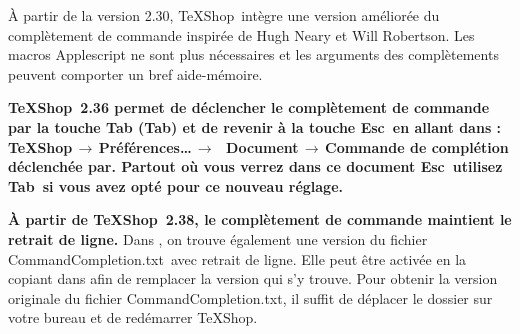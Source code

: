 \documentclass[11pt,french]{article}
\newcommand{\esckey}{\textsf{Esc}}
\newcommand{\tabkey}{\textsf{Tab}}
\newcommand{\mnu}[1]{\textsf{#1}}
\newcommand{\To}{\,\(\to\)\,}
\newcommand{\TS}{\textsf{\TeX Shop}}
\newcommand{\CCT}{\textsf{CommandCompletion.txt}}
\begin{document}
À partir de la version 2.30, \TS\ intègre une version améliorée du complètement de commande inspirée 
de Hugh Neary et Will Robertson. Les macros Applescript ne sont plus nécessaires et les arguments des 
complètements peuvent comporter un bref aide-mémoire.


{\bfseries\TS\ 2.36 permet de déclencher le complètement de commande par la touche Tab (\tabkey) et de revenir à la touche \esckey\ en allant dans : \mnu{TeXShop}\To\mnu{Préférences…}\To\ \mnu{Document}\To\mnu{Commande de complétion déclenchée par}. Partout où vous verrez dans ce document \esckey\ utilisez \tabkey\ si vous avez opté pour ce nouveau réglage.}


{\bfseries À partir de \TS\ 2.38, le complètement de commande maintient le retrait de ligne.} Dans , on trouve également une version du fichier \CCT\ avec retrait de ligne. Elle peut être activée en la copiant dans  afin de remplacer la version qui s'y trouve. Pour obtenir la version originale du fichier \CCT{}, il suffit de déplacer le dossier  sur votre bureau et de redémarrer \TS.



\end{document}
